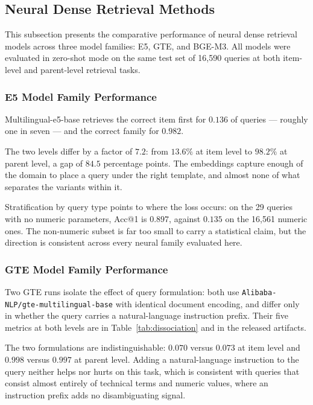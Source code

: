 \documentclass[preprint,review,12pt]{elsarticle}
\begin{document}
\subsection{Neural Dense Retrieval Methods}

This subsection presents the comparative performance of neural dense retrieval models across three model families: E5, GTE, and BGE-M3. All models were evaluated in zero-shot mode on the same test set of 16,590 queries at both item-level and parent-level retrieval tasks.

\subsubsection{E5 Model Family Performance}

Multilingual-e5-base retrieves the correct item first for $0.136$ of queries --- roughly one in seven --- and the correct family for $0.982$.

The two levels differ by a factor of $7.2$: from $13.6\%$ at item level to $98.2\%$ at parent level, a gap of $84.5$ percentage points. The embeddings capture enough of the domain to place a query under the right template, and almost none of what separates the variants within it.

Stratification by query type points to where the loss occurs: on the 29 queries with no numeric parameters, Acc@1 is $0.897$, against $0.135$ on the 16,561 numeric ones. The non-numeric subset is far too small to carry a statistical claim, but the direction is consistent across every neural family evaluated here.

\subsubsection{GTE Model Family Performance}
\label{subsec:gte}

Two GTE runs isolate the effect of query formulation: both use \texttt{Alibaba-NLP/gte-multilingual-base} with identical document encoding, and differ only in whether the query carries a natural-language instruction prefix. Their five metrics at both levels are in Table~\ref{tab:dissociation} and in the released artifacts.

The two formulations are indistinguishable: $0.070$ versus $0.073$ at item level and $0.998$ versus $0.997$ at parent level. Adding a natural-language instruction to the query neither helps nor hurts on this task, which is consistent with queries that consist almost entirely of technical terms and numeric values, where an instruction prefix adds no disambiguating signal.
\end{document}
